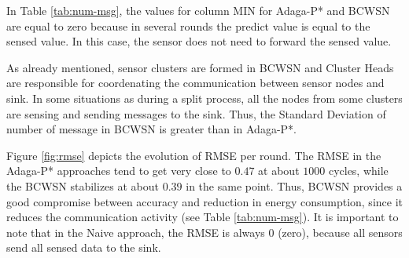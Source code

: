 \documentclass{acm_proc_article-sp}
\begin{document}
In Table \ref{tab:num-msg}, the values for column MIN for Adaga-P* and BCWSN are
equal to zero because in several rounds the predict value is equal to the sensed
value. In this case, the sensor does not need to forward the sensed value. 

As already mentioned, sensor clusters are formed in BCWSN and Cluster Heads are
responsible for coordenating the communication between sensor nodes and sink.
In some situations as during a split process, all the nodes from some clusters
are sensing and sending messages to the sink. Thus, the Standard Deviation of
number of message in BCWSN is greater than in Adaga-P*.




Figure \ref{fig:rmse} depicts the evolution of RMSE per round. The RMSE in the
Adaga-P* approaches tend to get very close to $0.47$ at about $1000$ cycles,
while the BCWSN stabilizes at about $0.39$ in the same point. Thus, BCWSN
provides a good compromise between accuracy and reduction in energy consumption,
since it reduces the communication activity (see Table \ref{tab:num-msg}). It is
important to note that in the Naive approach, the RMSE is always 0 (zero),
because all sensors send all sensed data to the sink.
\end{document}
